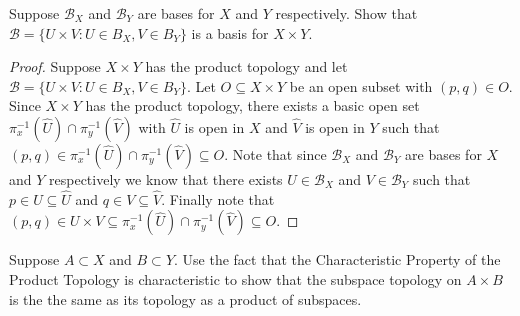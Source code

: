 \documentclass[minion]{homework651}
\begin{document}
\begin{problems}

\problem Suppose $\mathcal B_X$ and $\mathcal B_Y$ are bases for $X$ and $Y$ respectively.
Show that $\mathcal B = \{U\times V: U\in B_X, V\in B_Y\}$ is a basis for $X\times Y$.
\begin{proof} Suppose $X \times Y$ has the product topology and let $\mathcal B = \{U\times V: U\in B_X, V\in B_Y\}$.
    Let $O \subseteq X \times Y$ be an open subset with $(p, q) \in O$. Since $X\times Y$ has the product topology, there exists a basic open set 
    $\pi_x^{-1}(\hat{U}) \cap \pi_y^{-1}(\hat{V})$ with $\hat{U}$ is open in $X$ and $\hat{V}$ is open in $Y$ such that 
    $(p,q) \in \pi_x^{-1}(\hat{U}) \cap \pi_y^{-1}(\hat{V}) \subseteq O$. Note that since $\mathcal B_X$ and $\mathcal B_Y$ are bases for $X$ and $Y$ 
    respectively we know that there exists $U \in \mathcal B_X$ and $V \in \mathcal B_Y$ such that $p \in U \subseteq \hat{U}$ and $q \in V \subseteq \hat{V}$.
    Finally note that $(p,q) \in U \times V \subseteq \pi_x^{-1}(\hat{U}) \cap \pi_y^{-1}(\hat{V}) \subseteq O$.

    
\end{proof}


\problem Suppose $A\subset X$ and $B\subset Y$.  Use the fact that
the Characteristic Property of the Product Topology is characteristic to
show that the subspace topology on $A\times B$ is the the same as its
topology as a product of subspaces.


\end{problems}
\end{document}
